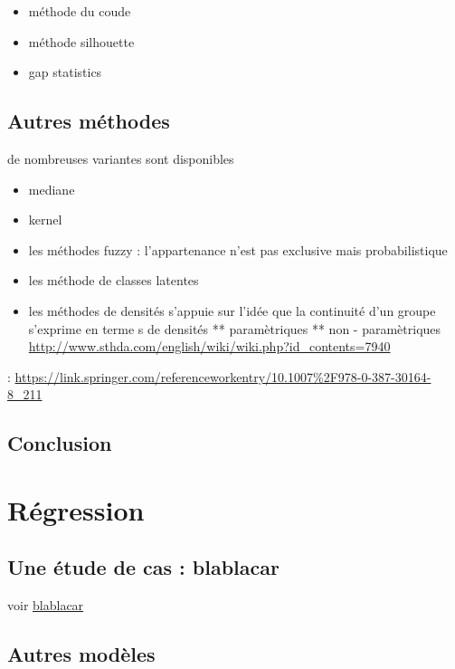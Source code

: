 \documentclass[
]{book}
\providecommand{\tightlist}{%
  \setlength{\itemsep}{0pt}\setlength{\parskip}{0pt}}
\begin{document}
\begin{itemize}
\tightlist
\item
  méthode du coude
\item
  méthode silhouette
\item
  gap statistics
\end{itemize}

\hypertarget{autres-muxe9thodes}{%
\section{Autres méthodes}\label{autres-muxe9thodes}}

de nombreuses variantes sont disponibles

\begin{itemize}
\tightlist
\item
  mediane
\item
  kernel
\item
  les méthodes fuzzy : l'appartenance n'est pas exclusive mais probabilistique
\item
  les méthode de classes latentes
\item
  les méthodes de densités s'appuie sur l'idée que la continuité d'un groupe s'exprime en terme s de densités
  ** paramètriques
  ** non - paramètriques \url{http://www.sthda.com/english/wiki/wiki.php?id_contents=7940}
\end{itemize}

: \url{https://link.springer.com/referenceworkentry/10.1007\%2F978-0-387-30164-8_211}

\hypertarget{conclusion}{%
\section{Conclusion}\label{conclusion}}

\hypertarget{ruxe9gression}{%
\chapter{Régression}\label{ruxe9gression}}

\hypertarget{une-uxe9tude-de-cas-blablacar}{%
\section{Une étude de cas : blablacar}\label{une-uxe9tude-de-cas-blablacar}}

voir \href{https://github.com/BenaventC/Covoiturage}{blablacar}

\hypertarget{autres-moduxe8les}{%
\section{Autres modèles}\label{autres-moduxe8les}}
\end{document}
